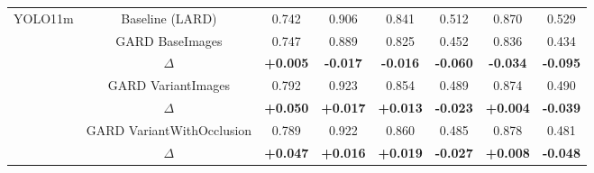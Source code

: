 \begin{table}[htbp]
\begin{tabular}{|c|c|ccc|ccc|}
\hline
\multirow{6}{*}{YOLO11m}
& Baseline (LARD) & 0.742 & 0.906 & 0.841 & 0.512 & 0.870 & 0.529 \\
& GARD BaseImages & 0.747 & 0.889 & 0.825 & 0.452 & 0.836 & 0.434 \\
& $\Delta$ & \textbf{+0.005} & \textbf{-0.017} & \textbf{-0.016} & \textbf{-0.060} & \textbf{-0.034} & \textbf{-0.095} \\
& GARD VariantImages & 0.792 & 0.923 & 0.854 & 0.489 & 0.874 & 0.490 \\
& $\Delta$ & \textbf{+0.050} & \textbf{+0.017} & \textbf{+0.013} & \textbf{-0.023} & \textbf{+0.004} & \textbf{-0.039} \\
& GARD VariantWithOcclusion & 0.789 & 0.922 & 0.860 & 0.485 & 0.878 & 0.481 \\
& $\Delta$ & \textbf{+0.047} & \textbf{+0.016} & \textbf{+0.019} & \textbf{-0.027} & \textbf{+0.008} & \textbf{-0.048} \\
\hline

\end{tabular}
\end{table}


